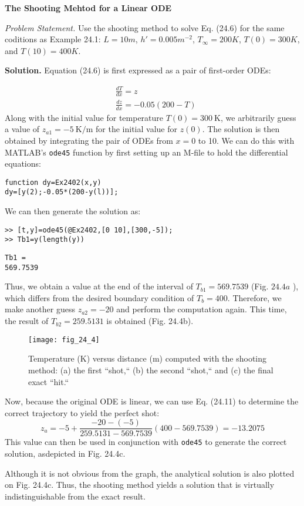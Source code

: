 \documentclass[../main.tex]{subfiles}
\begin{document}
\begin{exmp}
    \textbf{The Shooting Mehtod for a Linear ODE}

    \noindent \textit{Problem Statement.} Use the shooting method to solve Eq. (24.6) for the same coditions as Example 24.1: $L=10m$, $h'=0.005m^{-2}$, $T_\infty=200K$, $T(0)=300K$, and $T(10)=400K.$

    \noindent \textbf{Solution.} Equation (24.6) is first expressed as a pair of first-order ODEs:

    $$
    \begin{aligned}
    &\frac{d T}{d x}=z \\
    &\frac{d z}{d x}=-0.05(200-T)
    \end{aligned}
    $$
    Along with the initial value for temperature $T(0)=300 \mathrm{~K}$, we arbitrarily guess a value   of $z_{a 1}=-5 \mathrm{~K} / \mathrm{m}$ for the initial value for $z(0)$. The solution is then   obtained by integrating the pair of ODEs from $x=0$ to 10. We can do this with MATLAB's \texttt{ode45} function by first setting up an M-file to hold the differential equations:

    \noindent\texttt{function dy=Ex2402(x,y)\\
    dy=[y(2);-0.05*(200-y(l))];}

    \noindent We can then generate the solution as:

    \noindent\texttt{>> [t,y]=ode45(@Ex2402,[0 10],[300,-5]);\\
    >> Tb1=y(length(y))}

    \noindent\texttt{Tb1 =\\
    \vspace{\smallskipamount} 569.7539}

    \noindent Thus, we obtain a value at the end of the interval of $T_{b 1}=569.7539$ (Fig. $24.4 a$ ), which differs from the desired boundary condition of $T_{b}=400$. Therefore, we make another guess $z_{a 2}=-20$ and perform the computation again. This time, the result of $T_{b 2}=259.5131$ is obtained (Fig. 24.4b).

    \begin{figure}[H]
        \centering
        \texttt{[image: fig\_24\_4]}
       \caption{\textsf{Temperature (K) versus distance (m) computed with the shooting method: (a) the first ``shot,`` 
       (b) the second ``shot,`` and (c) the final exact ``hit.``}}\label{fig:fig_24_4}
    \end{figure}

    Now, because the original ODE is linear, we can use Eq. (24.11) to determine the correct trajectory to yield the perfect shot:
    $$
    z_{a}=-5+\frac{-20-(-5)}{259.5131-569.7539}(400-569.7539)=-13.2075
    $$
    \noindent This value can then be used in conjunction with \texttt{ode45} to generate the correct solution, asdepicted in Fig. 24.4c.

    Although it is not obvious from the graph, the analytical solution is also plotted on Fig. 24.4c. Thus, the shooting method yields a solution that is virtually indistinguishable from the exact result.
\end{exmp}
\end{document}

